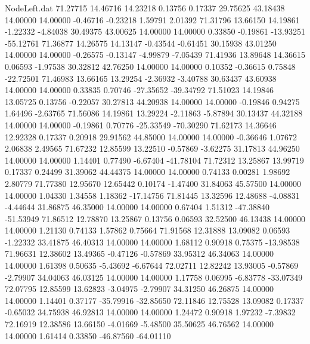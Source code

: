 \begin{filecontents}{NodeLeft.dat}
  71.27715   14.46716   14.23218     0.13756    0.17337   29.75625   43.18438   14.00000   14.00000   -0.46716   -0.23218    1.59791    2.01392
  71.31796   13.66150   14.19861    -1.22332   -4.84038   30.49375   43.00625   14.00000   14.00000    0.33850   -0.19861  -13.93251  -55.12761
  71.36877   14.26575   14.13147    -0.43544   -0.61451   30.15938   43.01250   14.00000   14.00000   -0.26575   -0.13147   -4.99879   -7.05439
  71.41936   13.89648   14.36615     0.06593   -1.97538   30.32812   42.76250   14.00000   14.00000    0.10352   -0.36615    0.75848  -22.72501
  71.46983   13.66165   13.29254    -2.36932   -3.40788   30.63437   43.60938   14.00000   14.00000    0.33835    0.70746  -27.35652  -39.34792
  71.51023   14.19846   13.05725     0.13756   -0.22057   30.27813   44.20938   14.00000   14.00000   -0.19846    0.94275    1.64496   -2.63765
  71.56086   14.19861   13.29224    -2.11863   -5.87894   30.13437   44.32188   14.00000   14.00000   -0.19861    0.70776  -25.33549  -70.30290
  71.62173   14.36646   12.92328     0.17337    0.20918   29.91562   44.85000   14.00000   14.00000   -0.36646    1.07672    2.06838    2.49565
  71.67232   12.85599   13.22510    -0.57869   -3.62275   31.17813   44.96250   14.00000   14.00000    1.14401    0.77490   -6.67404  -41.78104
  71.72312   13.25867   13.99719     0.17337    0.24499   31.39062   44.44375   14.00000   14.00000    0.74133    0.00281    1.98692    2.80779
  71.77380   12.95670   12.65442     0.10174   -1.47400   31.84063   45.57500   14.00000   14.00000    1.04330    1.34558    1.18362  -17.14756
  71.81445   13.32596   12.48688    -4.08831   -4.44644   31.86875   46.35000   14.00000   14.00000    0.67404    1.51312  -47.38840  -51.53949
  71.86512   12.78870   13.25867     0.13756    0.06593   32.52500   46.13438   14.00000   14.00000    1.21130    0.74133    1.57862    0.75664
  71.91568   12.31888   13.09082     0.06593   -1.22332   33.41875   46.40313   14.00000   14.00000    1.68112    0.90918    0.75375  -13.98538
  71.96631   12.38602   13.49365    -0.47126   -0.57869   33.95312   46.34063   14.00000   14.00000    1.61398    0.50635   -5.43692   -6.67644
  72.02711   12.82242   13.93005    -0.57869   -2.79907   34.04063   46.03125   14.00000   14.00000    1.17758    0.06995   -6.83778  -33.07349
  72.07795   12.85599   13.62823    -3.04975   -2.79907   34.31250   46.26875   14.00000   14.00000    1.14401    0.37177  -35.79916  -32.85650
  72.11846   12.75528   13.09082     0.17337   -0.65032   34.75938   46.92813   14.00000   14.00000    1.24472    0.90918    1.97232   -7.39832
  72.16919   12.38586   13.66150    -4.01669   -5.48500   35.50625   46.76562   14.00000   14.00000    1.61414    0.33850  -46.87560  -64.01110

\end{filecontents}
